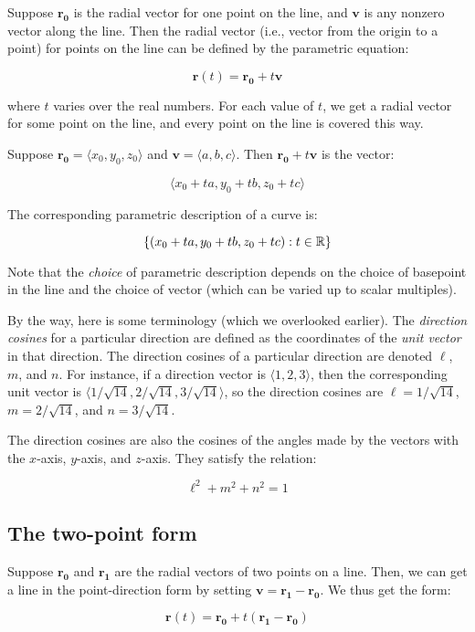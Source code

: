 \documentclass[10pt]{amsart}
\begin{document}
Suppose $\mathbf{r_0}$ is the radial vector for one point on the line,
and $\mathbf{v}$ is any nonzero vector along the line. Then the radial
vector (i.e., vector from the origin to a point) for points on the
line can be defined by the parametric equation:

$$\mathbf{r}(t) = \mathbf{r_0} + t\mathbf{v}$$

where $t$ varies over the real numbers. For each value of $t$, we get
a radial vector for some point on the line, and every point on the
line is covered this way.

Suppose $\mathbf{r_0} = \langle x_0, y_0, z_0 \rangle$ and $\mathbf{v} =
\langle a,b,c \rangle$. Then $\mathbf{r_0} + t\mathbf{v}$ is the
vector:

$$\langle x_0 + ta, y_0 + tb, z_0 + tc \rangle$$

The corresponding parametric description of a curve is:

$$\{ (x_0 + ta, y_0 + tb, z_0 + tc) : t \in \mathbb{R} \}$$

Note that the {\em choice} of parametric description depends on the
choice of basepoint in the line and the choice of vector (which can be
varied up to scalar multiples).

By the way, here is some terminology (which we overlooked
earlier). The {\em direction cosines} for a particular direction are
defined as the coordinates of the {\em unit vector} in that
direction. The direction cosines of a particular direction are denoted
$\ell$, $m$, and $n$. For instance, if a direction vector is $\langle
1,2,3 \rangle$, then the corresponding unit vector is $\langle
1/\sqrt{14}, 2/\sqrt{14}, 3/\sqrt{14} \rangle$, so the direction
cosines are $\ell = 1/\sqrt{14}$, $m = 2/\sqrt{14}$, and $n =
3/\sqrt{14}$.

The direction cosines are also the cosines of the angles made by the
vectors with the $x$-axis, $y$-axis, and $z$-axis. They satisfy the
relation:

$$\ell^2 + m^2 + n^2 = 1$$

\subsection{The two-point form}

Suppose $\mathbf{r_0}$ and $\mathbf{r_1}$ are the radial vectors of two
points on a line. Then, we can get a line in the point-direction form
by setting $\mathbf{v} = \mathbf{r_1} - \mathbf{r_0}$. We thus get the form:

$$\mathbf{r}(t) = \mathbf{r_0} + t(\mathbf{r_1} - \mathbf{r_0})$$
\end{document}
